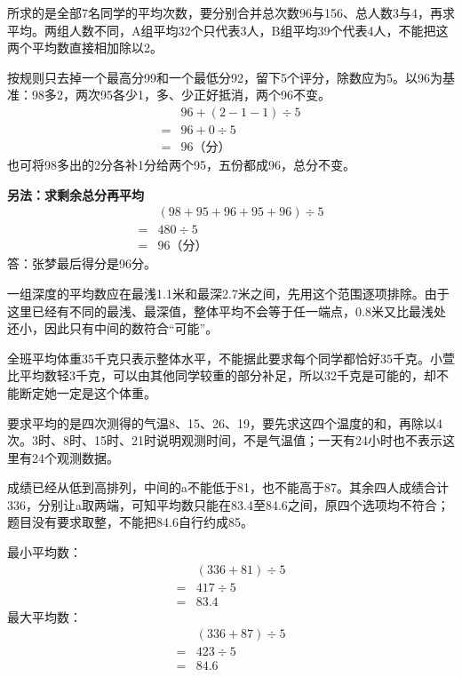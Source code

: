 \documentclass[multi=snippet,border=0pt]{standalone}
\newenvironment{snippet}[3]{\begin{minipage}{#1bp}\color{answerred}\fontsize{#2}{#3}\selectfont\raggedright}{\end{minipage}}
\begin{document}
\begin{snippet}{505}{11.5}{14}所求的是全部7名同学的平均次数，要分别合并总次数96与156、总人数3与4，再求平均。两组人数不同，A组平均32个只代表3人，B组平均39个代表4人，不能把这两个平均数直接相加除以2。\end{snippet}
\begin{snippet}{505}{11.5}{14}按规则只去掉一个最高分99和一个最低分92，留下5个评分，除数应为5。以96为基准：98多2，两次95各少1，多、少正好抵消，两个96不变。\[\begin{aligned}&96+(2-1-1)\div5\\={}&96+0\div5\\={}&96\text{（分）}\end{aligned}\]也可将98多出的2分各补1分给两个95，五份都成96，总分不变。\par\textbf{另法：求剩余总分再平均}\[\begin{aligned}&(98+95+96+95+96)\div5\\={}&480\div5\\={}&96\text{（分）}\end{aligned}\]答：张梦最后得分是96分。\end{snippet}
\begin{snippet}{505}{11.5}{14}一组深度的平均数应在最浅1.1米和最深2.7米之间，先用这个范围逐项排除。由于这里已经有不同的最浅、最深值，整体平均不会等于任一端点，0.8米又比最浅处还小，因此只有中间的数符合“可能”。\end{snippet}
\begin{snippet}{505}{11.5}{14}全班平均体重35千克只表示整体水平，不能据此要求每个同学都恰好35千克。小萱比平均数轻3千克，可以由其他同学较重的部分补足，所以32千克是可能的，却不能断定她一定是这个体重。\end{snippet}
\begin{snippet}{505}{11.5}{14}要求平均的是四次测得的气温8、15、26、19，要先求这四个温度的和，再除以4次。3时、8时、15时、21时说明观测时间，不是气温值；一天有24小时也不表示这里有24个观测数据。\end{snippet}
\begin{snippet}{505}{11.5}{14}成绩已经从低到高排列，中间的a不能低于81，也不能高于87。其余四人成绩合计336，分别让a取两端，可知平均数只能在83.4至84.6之间，原四个选项均不符合；题目没有要求取整，不能把84.6自行约成85。\par 最小平均数：\[\begin{aligned}&(336+81)\div5\\={}&417\div5\\={}&83.4\end{aligned}\]最大平均数：\[\begin{aligned}&(336+87)\div5\\={}&423\div5\\={}&84.6\end{aligned}\]\end{snippet}
\end{document}
